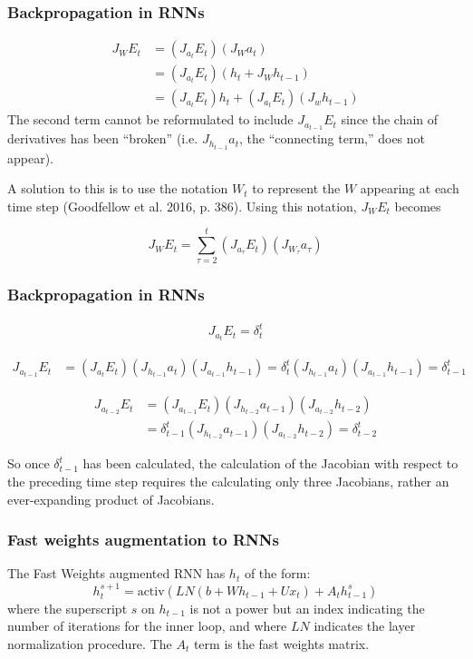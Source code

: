 \documentclass{beamer}
\begin{document}
\begin{frame}
  \frametitle{Backpropagation in RNNs}
  \begin{align*}
  J_{W} E_t & = (J_{a_t} E_t)(J_W a_t) \\
  & = (J_{a_t} E_t)(h_t + J_W h_{t-1}) \\
  & = (J_{a_t} E_t)h_t + (J_{a_t} E_t)(J_w h_{t-1})
\end{align*}
%
  The second term cannot be reformulated to include $J_{a_{t-1}} E_t$ since the chain of derivatives has been ``broken'' (i.e. $J_{h_{t-1}} a_t$, the ``connecting term,'' does not appear).

  \vspace{0.5cm}
  
  A solution to this is to use the notation $W_t$ to represent the $W$ appearing at each time step (Goodfellow et al. 2016, p. 386). Using this notation, $J_{W} E_t$ becomes

  \begin{equation*}
    J_{W} E_t = \sum_{\tau=2}^{t}  (J_{a_\tau} E_t)(J_{W_\tau} a_\tau)
  \end{equation*}

\end{frame}

\begin{frame}
  \frametitle{Backpropagation in RNNs}
\begin{align*}
  J_{a_t} E_t = \delta_{t}^t
\end{align*}

\begin{align*}
  J_{a_{t-1}} E_t & = (J_{a_t} E_t)(J_{h_{t-1}} a_t)(J_{a_{t-1}} h_{t-1}) = \delta_{t}^t (J_{h_{t-1}} a_{t})(J_{a_{t-1}} h_{t-1})  = \delta_{t-1}^t
\end{align*}

\begin{align*}
  J_{a_{t-2}} E_t & = (J_{a_{t-1}} E_t)(J_{h_{t-2}} a_{t-1})(J_{a_{t-2}} h_{t-2}) \\
  & = \delta_{t-1}^t (J_{h_{t-2}} a_{t-1})(J_{a_{t-2}} h_{t-2}) = \delta_{t-2}^t
\end{align*}

So once $\delta_{t-1}^t$ has been calculated, the calculation of the Jacobian with respect to the preceding time step requires the calculating only three Jacobians, rather an ever-expanding product of Jacobians.

\end{frame}

\begin{frame}
  \frametitle{Fast weights augmentation to RNNs}
  The Fast Weights augmented RNN has $h_t$ of the form:
    \begin{equation*}
      h_t^{s+1} = \mbox{activ}\left(LN(b + Wh_{t-1} + Ux_t) + A_t h_{t-1}^s\right)
    \end{equation*}
    where the superscript $s$ on $h_{t-1}$ is not a power but an index indicating the number of iterations for the inner loop, and where $LN$ indicates the layer normalization procedure. The $A_t$ term is the fast weights matrix.
\end{frame}
\end{document}

